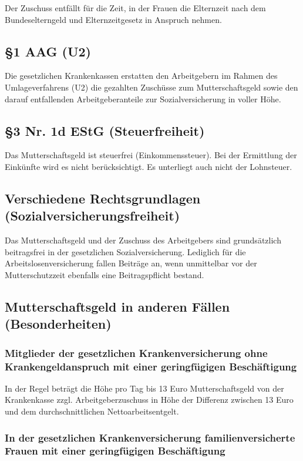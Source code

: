 \documentclass[a4paper, 12pt]{report}
\begin{document}
Der Zuschuss entfällt für die Zeit, in der Frauen die Elternzeit nach dem 
Bundeselterngeld und Elternzeitgesetz in Anspruch nehmen. 

\subsection{\S 1 AAG (U2)}

Die gesetzlichen Krankenkassen erstatten den Arbeitgebern im Rahmen des 
Umlageverfahrens (U2) die gezahlten Zuschüsse zum Mutterschaftsgeld sowie den 
darauf entfallenden Arbeitgeberanteile zur Sozialversicherung in voller Höhe. 

\subsection{\S 3 Nr. 1d EStG (Steuerfreiheit)}

Das Mutterschaftsgeld ist steuerfrei (Einkommenssteuer). Bei der Ermittlung der 
Einkünfte wird es nicht berücksichtigt. Es unterliegt auch nicht der Lohnsteuer. 

\subsection{Verschiedene Rechtsgrundlagen (Sozialversicherungsfreiheit)}

Das Mutterschaftsgeld und der Zuschuss des Arbeitgebers sind grundsätzlich 
beitragsfrei in der gesetzlichen  Sozialversicherung. Lediglich für die 
Arbeitslosenversicherung fallen Beiträge an, wenn unmittelbar vor der 
Mutterschutzzeit ebenfalls eine Beitragspflicht bestand. 

\subsection{Mutterschaftsgeld in anderen Fällen (Besonderheiten)}

\subsubsection{Mitglieder der gesetzlichen Krankenversicherung ohne 
Krankengeldanspruch mit  einer geringfügigen Beschäftigung}

In der Regel beträgt die Höhe pro Tag bis 13 Euro Mutterschaftsgeld von der 
Krankenkasse zzgl. Arbeitgeberzuschuss in Höhe der Differenz zwischen 13 Euro 
und dem durchschnittlichen Nettoarbeitsentgelt. 

\subsubsection{In der gesetzlichen Krankenversicherung familienversicherte 
Frauen mit einer geringfügigen Beschäftigung}
\end{document}
